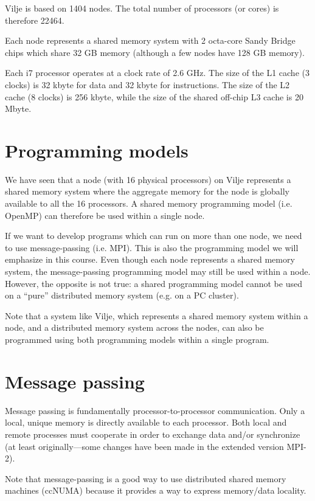 Vilje is based on 1404 nodes. The total number of processors (or cores) is
therefore 22464.

Each node represents a shared memory system with 2 octa-core Sandy Bridge chips
which share 32 GB memory (although a few nodes have 128 GB memory).

Each i7 processor operates at a clock rate of 2.6 GHz. The size of the L1 cache
(3 clocks) is 32 kbyte for data and 32 kbyte for instructions. The size of the
L2 cache (8 clocks) is 256 kbyte, while the size of the shared off-chip L3 cache
is 20 Mbyte.

\section{Programming models}

We have seen that a node (with 16 physical processors) on Vilje represents a
shared memory system where the aggregate memory for the node is globally
available to all the 16 processors. A shared memory programming model (i.e.
OpenMP) can therefore be used within a single node.

If we want to develop programs which can run on more than one node, we need to
use message-passing (i.e. MPI). This is also the programming model we will
emphasize in this course. Even though each node represents a shared memory
system, the message-passing programming model may still be used within a node.
However, the opposite is not true: a shared programming model cannot be used on
a ``pure'' distributed memory system (e.g. on a PC cluster).

Note that a system like Vilje, which represents a shared memory system within a
node, and a distributed memory system across the nodes, can also be programmed
using both programming models within a single program.

\section{Message passing}

Message passing is fundamentally processor-to-processor communication. Only a
local, unique memory is directly available to each processor. Both local and
remote processes must cooperate in order to exchange data and/or synchronize (at
least originally---some changes have been made in the extended version MPI-2).

Note that message-passing is a good way to use distributed shared memory
machines (ccNUMA) because it provides a way to express memory/data locality.

